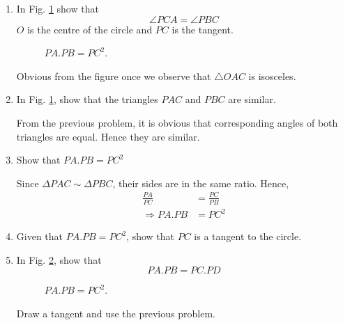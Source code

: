 \begin{enumerate}[label=\arabic*.,ref=\thesubsection.\theenumi]
%
\item
In Fig. \ref{ch4_tangent_prod} show that 
%
\begin{equation}
\angle PCA = \angle PBC
\end{equation}
%
$O$ is the centre of the circle and $PC$ is the tangent.

	\begin{figure}[!ht]
		\begin{center}
			
			\resizebox{\columnwidth}{!}{}
		\end{center}
		\caption{$PA.PB = PC^2$.}
		\label{ch4_tangent_prod}	
	\end{figure}

%
\solution Obvious from the figure once we observe that $\triangle OAC$ is isosceles.
%
%
\item
	In Fig. \ref{ch4_tangent_prod}, show that the triangles $PAC$ and $PBC$ are similar.

\solution From the previous problem, it is obvious that corresponding angles of both triangles are equal.  Hence they are similar.
%
\item
	Show that $PA.PB = PC^2$

\solution Since $\Delta PAC \sim \Delta PBC$, their sides are in the same ratio.  Hence,
%
\begin{align}
\frac{PA}{PC} &= \frac{PC}{PB} \\
\Rightarrow PA.PB &=PC^2
\end{align}
%
\item
Given that $PA.PB = PC^2$, show that $PC$ is a tangent to the circle.

%
\item
	In Fig. \ref{ch4_chord_tangent_prod}, show that\begin{equation}
	PA.PB = PC.PD
	\end{equation}

%
\begin{figure}[!ht]
	\begin{center}
		
		\resizebox{\columnwidth}{!}{}
	\end{center}
	\caption{$PA.PB = PC^2$.}
	\label{ch4_chord_tangent_prod}	
\end{figure}

\solution Draw a tangent and use the previous problem.
\end{enumerate}
